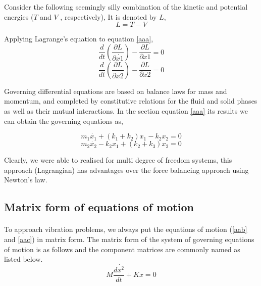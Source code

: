  Consider the following seemingly silly combination of the kinetic and potential energies ($T$ and $V$ , respectively), It is denoted by $L$,
\begin{equation}
\label{aaa}
    L = T-V
\end{equation}


Applying Lagrange’s equation to equation \eqref{aaa},
\begin{equation}
    \frac{d}{dt}(\frac{\partial L}{\partial \dot{x1}})-\frac{\partial L}{\partial x1} = 0 
\end{equation}
\begin{equation}
     \frac{d}{dt}(\frac{\partial L}{\partial \dot{x2}})-\frac{\partial L}{\partial x2} = 0
\end{equation}

Governing differential equations \cite{cartwright1945non} are based on balance laws for mass and momentum, and completed by constitutive relations for the fluid and solid phases as well as their mutual interactions. In the section  equation \eqref{aaa} its results we can obtain the governing equations as,

\newpage

\begin{equation}
\label{aab}
    m_1\dot{x_1}+(k_1+k_2)x_1-k_2x_2=0
\end{equation}
\begin{equation}
\label{aac}
    m_2\dot{x_2}-k_2x_1+(k_2+k_3)x_2 = 0
\end{equation}

Clearly,  we were able to realised for multi degree of freedom systems, this approach (Lagrangian) has advantages over the force balancing approach using Newton’s law.

\subsection{Matrix form of equations of motion}

\paragraph{}

To approach vibration problems, we always put the equations of motion (\eqref{aab} and \eqref{aac}) in matrix form. The matrix form of the system of governing equations of motion is as follows and the component matrices are commonly named as listed below. 
\begin{equation}
    M \frac{d\dot{x^2}}{dt}+ Kx = 0
\end{equation}

